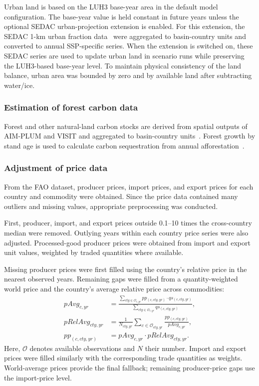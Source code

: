 Urban land is based on the LUH3 base-year area in the default model configuration.
The base-year value is held constant in future years unless the optional SEDAC urban-projection extension is enabled.  
For this extension, the SEDAC 1-km urban fraction data~\cite{gaoGlobal1kmDownscaled2021,gaoDownscalingSSPconsistent2021} were aggregated to basin-country units and converted to annual SSP-specific series.  
When the extension is switched on, these SEDAC series are used to update urban land in scenario runs while preserving the LUH3-based base-year level.
To maintain physical consistency of the land balance, urban area was bounded by zero and by available land after subtracting water/ice.

\subsubsection{Estimation of forest carbon data}

Forest and other natural-land carbon stocks are derived from spatial outputs of AIM-PLUM and VISIT and aggregated to basin-country units~\cite{hasegawaGlobalLanduseAllocation2017,itoWaterUseEfficiencyTerrestrial2012}. Forest growth by stand age is used to calculate carbon sequestration from annual afforestation~\cite{hasegawaCarefulSelectionForest2024}.


\subsubsection{Adjustment of price data}

From the FAO dataset, producer prices, import prices, and export prices 
for each country and commodity were obtained. 
Since the price data contained many outliers and missing values, 
appropriate preprocessing was conducted.  

First, producer, import, and export prices outside 0.1--10 times the cross-country median were removed. Outlying years within each country price series were also adjusted. Processed-good producer prices were obtained from import and export unit values, weighted by traded quantities where available.

Missing producer prices were first filled using the country's relative price in the nearest observed years. Remaining gaps were filled from a quantity-weighted world price and the country's average relative price across commodities:
\begin{align}
pAvg_{c,yr}
&= \frac{\sum_{cty\in\mathcal O_{c,yr}}pp_{(c,cty,yr)}\cdot qs_{(c,cty,yr)}}
{\sum_{cty\in\mathcal O_{c,yr}}qs_{(c,cty,yr)}},\\
pRelAvg_{cty,yr}
&= \frac{1}{N_{cty,yr}}\sum_{c\in\mathcal O_{cty,yr}}
\frac{pp_{(c,cty,yr)}}{pAvg_{c,yr}},\\
pp_{(c,cty,yr)}&=pAvg_{c,yr}\cdot pRelAvg_{cty,yr}.
\end{align}
Here, \(\mathcal O\) denotes available observations and \(N\) their number. Import and export prices were filled similarly with the corresponding trade quantities as weights. World-average prices provide the final fallback; remaining producer-price gaps use the import-price level.

